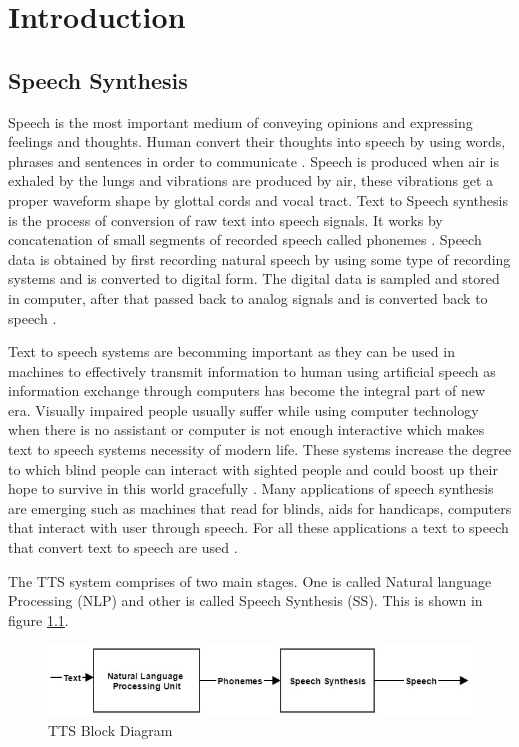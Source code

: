 \chapter{Introduction}

\section{Speech Synthesis}

Speech is the most important medium of conveying opinions and expressing feelings and thoughts.
Human convert their thoughts into speech by using words, phrases and sentences in order to communicate \cite{mumtaz2016break}. 
Speech is produced when air is exhaled by the lungs and vibrations are produced by air, these vibrations get a 
proper waveform shape by glottal cords and vocal tract. Text to Speech synthesis is the process of conversion of raw text into 
speech signals. It works by concatenation of small segments of recorded speech called phonemes \cite{khilari2015review}. Speech data is obtained by first recording natural speech by using some type of recording systems and is converted to digital form. The digital data is sampled and stored in computer, after that passed back to analog signals and is converted back to speech \cite{greene1986perception}. 

Text to speech systems are becomming important as they can be used in machines to effectively transmit
information to human using artificial speech as information exchange through computers has become the integral part of new
era. Visually impaired people usually suffer while using computer technology when there is no assistant or
computer is not enough interactive which makes text to speech systems necessity of modern life. These
systems increase the degree to which blind people can interact with sighted people \cite{klatt1987review} and could boost up
their hope to survive in this world gracefully \cite{aida2010main}. Many applications of speech synthesis are emerging such as 
machines that read for blinds, aids for handicaps, computers that interact with user through speech. 
For all these applications a text to speech that convert text to speech are used \cite{klatt1982klattalk}.

The TTS system comprises of two main stages. One is called Natural language Processing (NLP) and
other is called Speech Synthesis (SS). This is shown in figure \ref{fig:TTS Block Diagram}.

\begin{figure}[hp]
  \centering
  \includegraphics[width=\linewidth]{images/tts_bd.jpg}
  \caption{TTS Block Diagram}
  \label{fig:TTS Block Diagram}
\end{figure}

